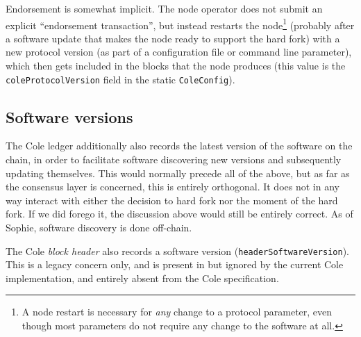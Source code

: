 Endorsement is somewhat implicit. The node operator does not submit an explicit
``endorsement transaction'', but instead restarts the
node\footnote{\label{cole:unnecessary-restarts}A node restart is necessary for
\emph{any} change to a protocol parameter, even though most parameters do not
require any change to the software at all.} (probably after a software update
that makes the node ready to support the hard fork) with a new protocol version
(as part of a configuration file or command line parameter), which then gets included
in the blocks that the node produces (this value is the
\lstinline!coleProtocolVersion! field in the static \lstinline!ColeConfig!).

\subsection{Software versions}

The Cole ledger additionally also records the latest version of the software on
the chain, in order to facilitate software discovering new versions and
subsequently updating themselves. This would normally precede all of the above,
but as far as the consensus layer is concerned, this is entirely orthogonal. It
does not in any way interact with either the decision to hard fork nor the
moment of the hard fork. If we did forego it, the discussion above would still
be entirely correct. As of Sophie, software discovery is done off-chain.

The Cole \emph{block header} also records a software version
(\lstinline!headerSoftwareVersion!). This is a legacy concern only, and is
present in but ignored by the current Cole implementation, and entirely absent
from the Cole specification.
